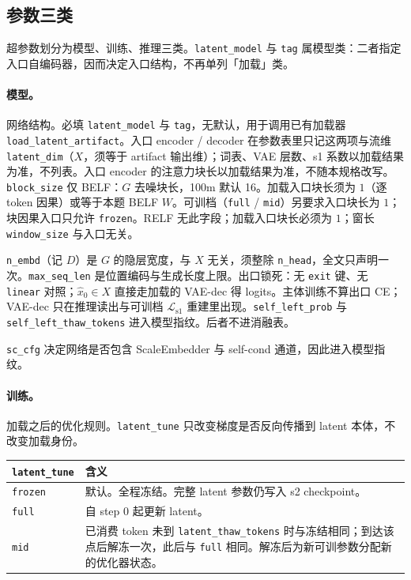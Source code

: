 \documentclass[UTF8,a4paper,11pt]{ctexart}
\begin{document}
\subsection{参数三类}

超参数划分为模型、训练、推理三类。\texttt{latent\_model} 与 \texttt{tag} 属模型类：二者指定入口自编码器，因而决定入口结构，不再单列「加载」类。

\paragraph{模型。}
网络结构。必填 \texttt{latent\_model} 与 \texttt{tag}，无默认，用于调用已有加载器 \texttt{load\_latent\_artifact}。入口 encoder / decoder 在参数表里只记这两项与流维 \texttt{latent\_dim}（\(X\)，须等于 artifact 输出维）；词表、VAE 层数、s1 系数以加载结果为准，不列表。入口 encoder 的注意力块长以加载结果为准，不随本规格改写。\texttt{block\_size} 仅 BELF：\(G\) 去噪块长，100m 默认 16。加载入口块长须为 \(1\)（逐 token 因果）或等于本题 BELF \(W\)。可训档（\texttt{full} / \texttt{mid}）另要求入口块长为 \(1\)；块因果入口只允许 \texttt{frozen}。RELF 无此字段；加载入口块长必须为 \(1\)；窗长 \texttt{window\_size} 与入口无关。

\texttt{n\_embd}（记 \(D\)）是 \(G\) 的隐层宽度，与 \(X\) 无关，须整除 \texttt{n\_head}，全文只声明一次。\texttt{max\_seq\_len} 是位置编码与生成长度上限。出口锁死：无 \texttt{exit} 键、无 \texttt{linear} 对照；\(\hat x_0\in X\) 直接走加载的 VAE-dec 得 logits。主体训练不算出口 CE；VAE-dec 只在推理读出与可训档 \(\mathcal{L}_{\mathrm{s1}}\) 重建里出现。\texttt{self\_left\_prob} 与 \texttt{self\_left\_thaw\_tokens} 进入模型指纹。后者不进消融表。

\texttt{sc\_cfg} 决定网络是否包含 ScaleEmbedder 与 self-cond 通道，因此进入模型指纹。

\paragraph{训练。}
加载之后的优化规则。\texttt{latent\_tune} 只改变梯度是否反向传播到 latent 本体，不改变加载身份。

\begin{center}
\begin{tabularx}{\textwidth}{@{}lX@{}}
\toprule
\texttt{latent\_tune} & 含义 \\
\midrule
\texttt{frozen} & 默认。全程冻结。完整 latent 参数仍写入 s2 checkpoint。 \\
\texttt{full} & 自 step 0 起更新 latent。 \\
\texttt{mid} & 已消费 token 未到 \texttt{latent\_thaw\_tokens} 时与冻结相同；到达该点后解冻一次，此后与 \texttt{full} 相同。解冻后为新可训参数分配新的优化器状态。 \\
\bottomrule
\end{tabularx}
\end{center}
\end{document}
